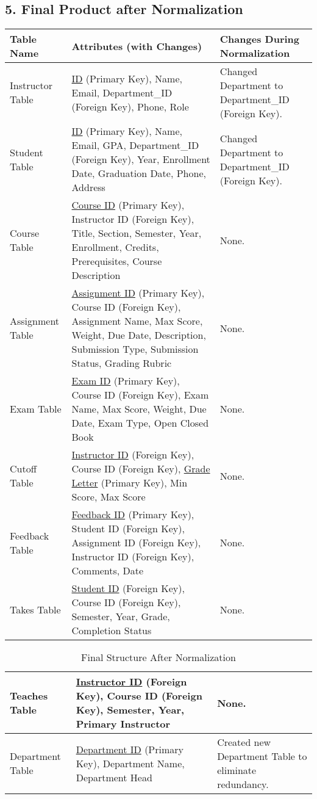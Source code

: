 \documentclass[12pt]{article}
\begin{document}
\subsection*{5. Final Product after Normalization}
\begin{table}[H]
    \centering
    \begin{tabularx}{\textwidth}{|X|X|X|}
        \hline
        \textbf{Table Name} & \textbf{Attributes (with Changes)} & \textbf{Changes During Normalization} \\
        \hline
        Instructor Table & \underline{ID} (Primary Key), Name, Email, Department\_ID (Foreign Key), Phone, Role & Changed Department to Department\_ID (Foreign Key). \\
        \hline
        Student Table & \underline{ID} (Primary Key), Name, Email, GPA, Department\_ID (Foreign Key), Year, Enrollment Date, Graduation Date, Phone, Address & Changed Department to Department\_ID (Foreign Key). \\
        \hline
        Course Table & \underline{Course ID} (Primary Key), Instructor ID (Foreign Key), Title, Section, Semester, Year, Enrollment, Credits, Prerequisites, Course Description & None. \\
        \hline
        Assignment Table & \underline{Assignment ID} (Primary Key), Course ID (Foreign Key), Assignment Name, Max Score, Weight, Due Date, Description, Submission Type, Submission Status, Grading Rubric & None. \\
        \hline
        Exam Table & \underline{Exam ID} (Primary Key), Course ID (Foreign Key), Exam Name, Max Score, Weight, Due Date, Exam Type, Open Closed Book & None. \\
        \hline
        Cutoff Table & \underline{Instructor ID} (Foreign Key), Course ID (Foreign Key), \underline{Grade Letter} (Primary Key), Min Score, Max Score & None. \\
        \hline
        Feedback Table & \underline{Feedback ID} (Primary Key), Student ID (Foreign Key), Assignment ID (Foreign Key), Instructor ID (Foreign Key), Comments, Date & None. \\
        \hline
        Takes Table & \underline{Student ID} (Foreign Key), Course ID (Foreign Key), Semester, Year, Grade, Completion Status & None. \\
        \hline
        \end{tabularx}
 \end{table}
\begin{table}[H]
    \centering
    \begin{tabularx}{\textwidth}{|X|X|X|}
        \hline
        Teaches Table & \underline{Instructor ID} (Foreign Key), Course ID (Foreign Key), Semester, Year, Primary Instructor & None. \\
        \hline
        Department Table & \underline{Department ID} (Primary Key), Department Name, Department Head & Created new Department Table to eliminate redundancy. \\
        \hline
    \end{tabularx}
    \caption{Final Structure After Normalization}
    \label{tab:final_structure}
\end{table}
\end{document}

